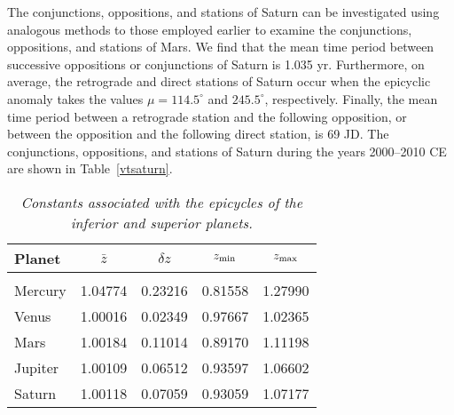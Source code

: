 The conjunctions, oppositions, and stations of Saturn can be investigated
using analogous methods to those employed earlier to examine the
conjunctions, oppositions, and stations of Mars. We find that the mean
time period between successive oppositions or conjunctions of
Saturn is 1.035 yr. Furthermore, on average, the retrograde and direct
stations of Saturn occur when the epicyclic anomaly takes the
values $\mu=114.5^\circ$ and $245.5^\circ$, respectively. Finally,
the mean time period between a retrograde station and the following
opposition, or between the opposition and the following direct
station, is 69 JD. The conjunctions, oppositions, and stations of Saturn
during the years 2000--2010 CE are shown in Table~\ref{vtsaturn}.

\clearpage
\begin{table}
\centering
\begin{tabular}{l|cccc}
Planet & $\bar{z}$ & $\delta z$ & $z_{\rm min}$ & $z_{\rm max}$\\\hline
&&&&\\[-2ex]
Mercury & 1.04774 & 0.23216 & 0.81558 & 1.27990\\
Venus & 1.00016 & 0.02349 & 0.97667 & 1.02365\\
Mars & 1.00184 & 0.11014 & 0.89170 & 1.11198\\
Jupiter & 1.00109 & 0.06512 & 0.93597 & 1.06602\\
Saturn & 1.00118 & 0.07059 & 0.93059 & 1.07177\\
\end{tabular}
\caption{\em Constants associated with the epicycles of the inferior and superior planets.}\label{vtx}
\end{table}

